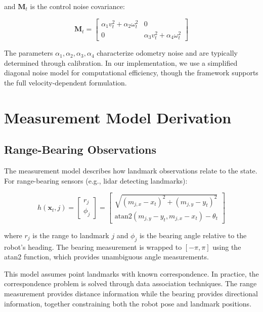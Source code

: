 \documentclass[12pt,a4paper]{article}
\newcommand{\state}{\bm{x}}
\begin{document}
and $\bm{M}_t$ is the control noise covariance:

\begin{equation}
    \bm{M}_t = \begin{bmatrix}
        \alpha_1 v_t^2 + \alpha_2 \omega_t^2 & 0 \\
        0 & \alpha_3 v_t^2 + \alpha_4 \omega_t^2
    \end{bmatrix}
\end{equation}

The parameters $\alpha_1, \alpha_2, \alpha_3, \alpha_4$ characterize odometry noise and are typically determined through calibration. In our implementation, we use a simplified diagonal noise model for computational efficiency, though the framework supports the full velocity-dependent formulation.

\section{Measurement Model Derivation}

\subsection{Range-Bearing Observations}

The measurement model describes how landmark observations relate to the state. For range-bearing sensors (e.g., lidar detecting landmarks):

\begin{equation}
    h(\state_t, j) = \begin{bmatrix}
        r_j \\
        \phi_j
    \end{bmatrix} = \begin{bmatrix}
        \sqrt{(m_{j,x} - x_t)^2 + (m_{j,y} - y_t)^2} \\
        \text{atan2}(m_{j,y} - y_t, m_{j,x} - x_t) - \theta_t
    \end{bmatrix}
    \label{eq:measurement_model}
\end{equation}

where $r_j$ is the range to landmark $j$ and $\phi_j$ is the bearing angle relative to the robot's heading. The bearing measurement is wrapped to $[-\pi, \pi]$ using the atan2 function, which provides unambiguous angle measurements.

This model assumes point landmarks with known correspondence. In practice, the correspondence problem is solved through data association techniques. The range measurement provides distance information while the bearing provides directional information, together constraining both the robot pose and landmark positions.
\end{document}

